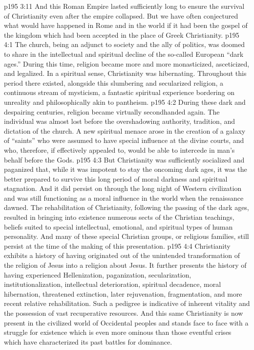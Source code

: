 \vs p195 3:11 And this Roman Empire lasted sufficiently long to ensure the survival of Christianity even after the empire collapsed. But we have often conjectured what would have happened in Rome and in the world if it had been the gospel of the kingdom which had been accepted in the place of Greek Christianity.
\vs p195 4:1 The church, being an adjunct to society and the ally of politics, was doomed to share in the intellectual and spiritual decline of the so\hyp{}called European “dark ages.” During this time, religion became more and more monasticized, asceticized, and legalized. In a spiritual sense, Christianity was hibernating. Throughout this period there existed, alongside this slumbering and secularized religion, a continuous stream of mysticism, a fantastic spiritual experience bordering on unreality and philosophically akin to pantheism.
\vs p195 4:2 During these dark and despairing centuries, religion became virtually secondhanded again. The individual was almost lost before the overshadowing authority, tradition, and dictation of the church. A new spiritual menace arose in the creation of a galaxy of “saints” who were assumed to have special influence at the divine courts, and who, therefore, if effectively appealed to, would be able to intercede in man’s behalf before the Gods.
\vs p195 4:3 But Christianity was sufficiently socialized and paganized that, while it was impotent to stay the oncoming dark ages, it was the better prepared to survive this long period of moral darkness and spiritual stagnation. And it did persist on through the long night of Western civilization and was still functioning as a moral influence in the world when the renaissance dawned. The rehabilitation of Christianity, following the passing of the dark ages, resulted in bringing into existence numerous sects of the Christian teachings, beliefs suited to special intellectual, emotional, and spiritual types of human personality. And many of these special Christian groups, or religious families, still persist at the time of the making of this presentation.
\vs p195 4:4 \pc Christianity exhibits a history of having originated out of the unintended transformation of the religion of Jesus into a religion about Jesus. It further presents the history of having experienced Hellenization, paganization, secularization, institutionalization, intellectual deterioration, spiritual decadence, moral hibernation, threatened extinction, later rejuvenation, fragmentation, and more recent relative rehabilitation. Such a pedigree is indicative of inherent vitality and the possession of vast recuperative resources. And this same Christianity is now present in the civilized world of Occidental peoples and stands face to face with a struggle for existence which is even more ominous than those eventful crises which have characterized its past battles for dominance.
